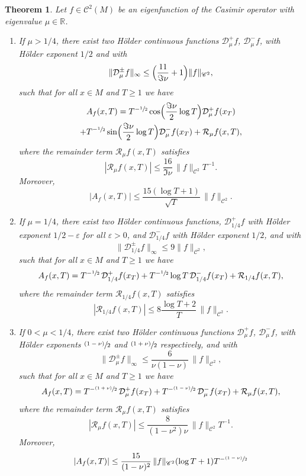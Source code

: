 \documentclass[JEP,XML,SOM,NoEqCountersInSection,Unicode,published]{cedram}
\newenvironment{enumeratei}
{\bgroup\def\theenumi{\roman{enumi}}\def\theenumii{\arabic{enumii}}\begin{enumerate}}
{\end{enumerate}\egroup}
\newcommand{\psfrac}[2]{\sfrac{(#1)}{#2}}
\newcommand \R{\mathbb{R}}
\newcommand{\Dp}[1]{\mathcal{D}_\mu^{+} #1}
\newcommand{\Dm}[1]{\mathcal{D}_\mu^{-} #1}
\newcommand{\Dpm}[1]{\mathcal{D}_\mu^{\pm} #1}
\newcommand{\RxT}{\mathcal{R}_\mu f(x,T)}
\newcommand{\aver}[1]{A_{#1}(x,T)}
\newtheorem{theorem}{Theorem}
\theoremstyle{definition}
\begin{document}
\begin{theorem}\label{thm:main1}
Let $f \in \mathscr{C}^2(M)$ be an eigenfunction of the Casimir operator with eigenvalue $\mu \in \R$.
\begin{enumeratei}
\item\label{thm:main1i}
If $\mu > 1/4$, there exist two Hölder continuous functions $\Dp{f}$, $\Dm{f}$, with Hölder exponent $1/2$ and with
\[
\|\Dpm{f} \|_{\infty} \leq \Bigl(\frac{11}{\Im \nu} + 1 \Bigr) \|f\|_{\mathscr{C}^2},
\]
such that for all $x \in M$ and $T \geq 1$ we have
\begin{multline*}
\aver{f} = T^{-\sfrac{1}{2}} \cos\Bigl(\frac{\Im \nu}{2} \log T \Bigr) \Dp{ f(x_T)}\\
+ T^{-\sfrac{1}{2}} \sin\Bigl(\frac{\Im \nu}{2} \log T \Bigr) \Dm{ f(x_T)}+ \RxT,
\end{multline*}
where the remainder term $\RxT$ satisfies
\[
|\RxT|\leq \frac{16}{\Im \nu}\, \|f\|_{\mathscr{C}^2} T^{-1}.
\]
Moreover,
\begin{equation}\label{eq:aux_thm_1_princ}
|\aver{f}|\leq \frac{15(\log T +1)}{\sqrt{T}}\, \|f\|_{\mathscr{C}^2}.
\end{equation}

\item\label{thm:main1ii}
If $\mu = 1/4$, there exist two Hölder continuous functions, $\mathcal{D}^{+}_{1/4}f$ with Hölder exponent $1/2 - \varepsilon$ for all $\varepsilon >0$, and $\mathcal{D}^{-}_{1/4}f$ with Hölder exponent $1/2$, and with
\[
\|\mathcal{D}^{\pm}_{1/4}f \|_{\infty} \leq 9 \|f\|_{\mathscr{C}^2},
\]
such that for all $x \in M$ and $T \geq 1$ we have
\[
\aver{f} = T^{-\sfrac{1}{2}} \, \mathcal{D}^{+}_{1/4} f(x_T) + T^{-\sfrac{1}{2}} \log T \, \mathcal{D}^{-}_{1/4} f(x_T) +\mathcal{R}_{1/4}f(x,T),
\]
where the remainder term $\mathcal{R}_{1/4}f(x,T)$ satisfies
\[
|\mathcal{R}_{1/4}f(x,T)|\leq 8 \frac{\log T +2}{T}\, \|f\|_{\mathscr{C}^2}.
\]

\item\label{thm:main1iii}
If $0< \mu < 1/4$, there exist two Hölder continuous functions $\Dp{f}$, $\Dm{f}$, with Hölder exponents $\psfrac{1-\nu}{2} $ and $\psfrac{1+\nu}{2} $ respectively, and with
\[
\|\Dpm{f} \|_{\infty} \leq \frac{6}{\nu(1-\nu)}\, \|f\|_{\mathscr{C}^2},
\]
such that for all $x \in M$ and $T \geq 1$ we have
\[
\aver{f} = T^{-\psfrac{1+\nu}{2}} \, \Dp{f(x_T) } + T^{-\psfrac{1-\nu}{2}} \, \Dm{ f(x_T)} + \RxT,
\]
where the remainder term $\RxT$ satisfies
\[
|\RxT|\leq \frac{8}{(1-\nu^2) \nu}\, \|f\|_{\mathscr{C}^2} T^{-1}.
\]
Moreover,
\begin{equation}\label{eq:aux_thm_1_comp}
|\aver{f}|\leq \frac{15}{(1-\nu)^2}\, \|f\|_{\mathscr{C}^2} (\log T +1) T^{-\psfrac{1-\nu}{2}}
\end{equation}


\end{enumeratei}
\end{theorem}
\end{document}

